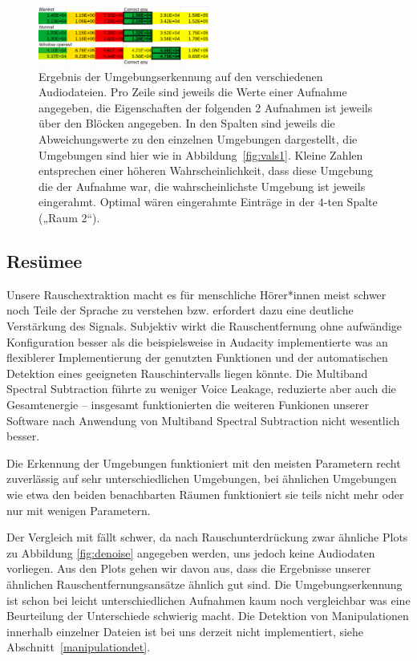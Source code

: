 \documentclass[
	fontsize=10.5pt,
	marginpar=false,
	ngerman,
	accentcolor=3d
	]{tudapub}
\begin{document}
\begin{figure}[h]
	\centering
	\includegraphics[width=0.5\textwidth]{media/vals1}
	\caption{Ergebnis der Umgebungserkennung auf den verschiedenen Audiodateien. Pro Zeile sind jeweils die Werte einer Aufnahme angegeben, die Eigenschaften der folgenden 2 Aufnahmen ist jeweils über den Blöcken angegeben. In den Spalten sind jeweils die Abweichungswerte zu den einzelnen Umgebungen dargestellt, die Umgebungen sind hier wie in Abbildung~\ref{fig:vals1}. Kleine Zahlen entsprechen einer höheren Wahrscheinlichkeit, dass diese Umgebung die der Aufnahme war, die wahrscheinlichste Umgebung ist jeweils eingerahmt. Optimal wären eingerahmte Einträge in der $4$-ten Spalte („Raum 2“).}
	\label{fig:vals2}
\end{figure}


\subsection{Resümee}

Unsere Rauschextraktion macht es für menschliche Hörer*innen meist schwer noch Teile der Sprache zu verstehen bzw. erfordert dazu eine deutliche Verstärkung des Signals. Subjektiv wirkt die Rauschentfernung ohne aufwändige Konfiguration besser als die beispielsweise in Audacity \cite{audacity_audacity_nodate} implementierte was an flexiblerer Implementierung der genutzten Funktionen und der automatischen Detektion eines geeigneten Rauschintervalls liegen könnte. Die Multiband Spectral Subtraction führte zu weniger Voice Leakage, reduzierte aber auch die Gesamtenergie – insgesamt funktionierten die weiteren Funkionen unserer Software nach Anwendung von Multiband Spectral Subtraction nicht wesentlich besser.

Die Erkennung der Umgebungen funktioniert mit den meisten Parametern recht zuverlässig auf sehr unterschiedlichen Umgebungen, bei ähnlichen Umgebungen wie etwa den beiden benachbarten Räumen funktioniert sie teils nicht mehr oder nur mit wenigen Parametern.

Der Vergleich mit \cite{ikram_digital_2010} fällt schwer, da nach Rauschunterdrückung zwar ähnliche Plots zu Abbildung \ref{fig:denoise} angegeben werden, uns jedoch keine Audiodaten vorliegen. Aus den Plots gehen wir davon aus, dass die Ergebnisse unserer ähnlichen Rauschentfernungsansätze ähnlich gut sind. Die Umgebungserkennung ist schon bei leicht unterschiedlichen Aufnahmen kaum noch vergleichbar was eine Beurteilung der Unterschiede schwierig macht. Die Detektion von Manipulationen innerhalb einzelner Dateien ist bei uns derzeit nicht implementiert, siehe Abschnitt~\ref{manipulationdet}.
\end{document}
